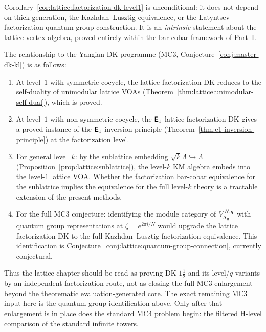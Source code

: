 \begin{remark}
\label{rem:lattice:factorization-dk-programme}
Corollary~\ref{cor:lattice:factorization-dk-level1} is
unconditional: it does not depend on thick generation, the
Kazhdan--Lusztig equivalence, or the Latyntsev factorization
quantum group construction.  It is an \emph{intrinsic} statement
about the lattice vertex algebra, proved entirely within the
bar-cobar framework of Part~I.

The relationship to the Yangian DK programme
(MC3, Conjecture~\ref{conj:master-dk-kl}) is as follows:
\begin{enumerate}[label=\textup{(\alph*)}]
\item At level~$1$ with symmetric cocycle, the lattice factorization
  DK reduces to the self-duality of unimodular lattice VOAs
  (Theorem~\ref{thm:lattice:unimodular-self-dual}), which is proved.

\item At level~$1$ with non-symmetric cocycle, the $\mathsf{E}_1$ lattice
  factorization DK gives a proved instance of the $\mathsf{E}_1$ inversion
  principle (Theorem~\ref{thm:e1-inversion-principle}) at the
  factorization level.

\item For general level~$k$: by the sublattice embedding
  $\sqrt{k}\Lambda \hookrightarrow \Lambda$
  (Proposition~\ref{prop:lattice:sublattice}), the level-$k$ KM
  algebra embeds into the level-$1$ lattice VOA.  Whether the
  factorization bar-cobar equivalence for the sublattice implies
  the equivalence for the full level-$k$ theory is a
  tractable extension of the present methods.

\item For the full MC3 conjecture: identifying the module category of
  $V_{\Lambda_{\mathfrak{g}}}^{N,q}$ with quantum group representations
  at $\zeta = e^{2\pi i/N}$ would upgrade the lattice
  factorization DK to the full Kazhdan--Lusztig factorization
  equivalence.  This identification is
  Conjecture~\ref{conj:lattice:quantum-group-connection}, currently
  conjectural.
\end{enumerate}

Thus the lattice chapter should be read as proving DK-$1\frac{1}{2}$ and
its level/$q$ variants by an independent factorization route, not as
closing the full MC3 enlargement beyond the theorematic
evaluation-generated core.  The exact remaining MC3 input here is the
quantum-group identification above.  Only after that enlargement is in
place does the standard MC4 problem begin: the filtered H-level
comparison of the standard infinite towers.


\end{remark}
